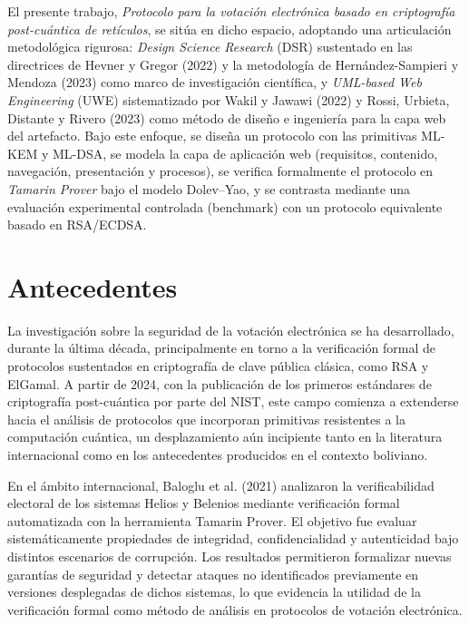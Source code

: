 El presente trabajo, \textit{Protocolo para la votación electrónica basado en criptografía post-cuántica de retículos}, se sitúa en dicho espacio, adoptando una articulación metodológica rigurosa: \textit{Design Science Research} (DSR) sustentado en las directrices de Hevner y Gregor (2022) y la metodología de Hernández-Sampieri y Mendoza (2023) como marco de investigación científica, y \textit{UML-based Web Engineering} (UWE) sistematizado por Wakil y Jawawi (2022) y Rossi, Urbieta, Distante y Rivero (2023) como método de diseño e ingeniería para la capa web del artefacto. Bajo este enfoque, se diseña un protocolo con las primitivas ML-KEM y ML-DSA, se modela la capa de aplicación web (requisitos, contenido, navegación, presentación y procesos), se verifica formalmente el protocolo en \textit{Tamarin Prover} bajo el modelo Dolev--Yao, y se contrasta mediante una evaluación experimental controlada (benchmark) con un protocolo equivalente basado en RSA/ECDSA.

\section{Antecedentes}
La investigación sobre la seguridad de la votación electrónica se ha desarrollado, durante la última década, principalmente en torno a la verificación formal de protocolos sustentados en criptografía de clave pública clásica, como RSA y ElGamal. A partir de 2024, con la publicación de los primeros estándares de criptografía post-cuántica por parte del NIST, este campo comienza a extenderse hacia el análisis de protocolos que incorporan primitivas resistentes a la computación cuántica, un desplazamiento aún incipiente tanto en la literatura internacional como en los antecedentes producidos en el contexto boliviano.

En el ámbito internacional, Baloglu et al. (2021) analizaron la verificabilidad electoral de los sistemas Helios y Belenios mediante verificación formal automatizada con la herramienta Tamarin Prover. El objetivo fue evaluar sistemáticamente propiedades de integridad, confidencialidad y autenticidad bajo distintos escenarios de corrupción. Los resultados permitieron formalizar nuevas garantías de seguridad y detectar ataques no identificados previamente en versiones desplegadas de dichos sistemas, lo que evidencia la utilidad de la verificación formal como método de análisis en protocolos de votación electrónica.

